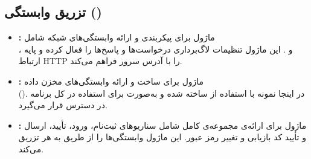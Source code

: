 \subsection{تزریق وابستگی ()}
\begin{itemize}
	\item \textbf{:}  
	ماژول  برای پیکربندی و ارائه وابستگی‌های شبکه شامل\\ ،  و . این ماژول تنظیمات لاگ‌برداری درخواست‌ها و پاسخ‌ها را فعال کرده و پایه ارتباط HTTP را با آدرس سرور فراهم می‌کند.
	\item \textbf{:}  
	ماژول  برای ساخت و ارائه وابستگی‌های مخزن داده \\(). در اینجا نمونه  با استفاده از  ساخته شده و به‌صورت  برای استفاده در کل برنامه در دسترس قرار می‌گیرد.
	\item \textbf{:}  
	ماژول  برای ارائه‌ی مجموعه‌ی کامل  شامل سناریوهای ثبت‌نام، ورود، تأیید، ارسال و تأیید کد بازیابی و تغییر رمز عبور. این ماژول وابستگی‌ها را از طریق  به هر  تزریق می‌کند.
\end{itemize}

